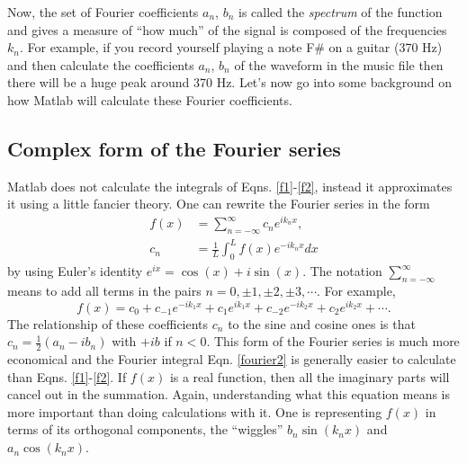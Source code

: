 \documentclass[12pt]{article}
\begin{document}
Now, the set of Fourier coefficients $a_n$, $b_n$ is called the \textit{spectrum} of the function and gives a measure of ``how much'' of the signal is composed of the frequencies $k_n$. For example, if you record yourself playing a note F\# on a guitar (370 Hz) and then calculate the coefficients $a_n$, $b_n$ of the waveform in the music file then there will be a huge peak around 370 Hz. Let's now go into some background on how Matlab will calculate these Fourier coefficients.

\subsection{Complex form of the Fourier series}
Matlab does not calculate the integrals of Eqns. \ref{f1}-\ref{f2}, instead it approximates it using a little fancier theory. One can rewrite the Fourier series in the form
\begin{align}
  f(x) &= \sum_{n=-\infty}^\infty c_ne^{ik_nx},\\
  c_n &= \frac{1}{L}\int_0^Lf(x)e^{-ik_nx}dx\label{fourier2}
\end{align}
by using Euler's identity $e^{ix} = \cos(x) + i\sin(x)$. The notation $\sum_{n=-\infty}^\infty$ means to add all terms in the pairs $n=0, \pm 1, \pm 2, \pm 3, \cdots$. For example,
\begin{equation}
  f(x) = c_0 + c_{-1}e^{-ik_1x} + c_1e^{ik_1x} + c_{-2}e^{-ik_2x} + c_2e^{ik_2x} + \cdots.
\end{equation}
The relationship of these coefficients $c_n$ to the sine and cosine ones is that $c_n = \frac{1}{2}(a_n - ib_n)$ with $+ib$ if $n<0$. This form of the Fourier series is much more economical and the Fourier integral Eqn. \ref{fourier2} is generally easier to calculate than Eqns. \ref{f1}-\ref{f2}. If $f(x)$ is a real function, then all the imaginary parts will cancel out in the summation. Again, understanding what this equation means is more important than doing calculations with it. One is representing $f(x)$ in terms of its orthogonal components, the ``wiggles'' $b_n\sin(k_nx)$ and $a_n\cos(k_nx)$.
\end{document}
